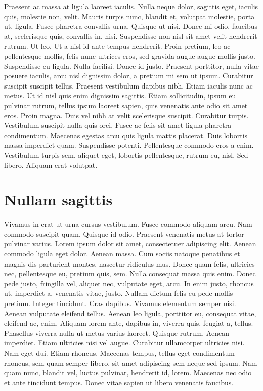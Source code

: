 \documentclass[a4paper,11pt]{scrartcl}
\begin{document}
 Praesent ac massa at ligula laoreet iaculis. Nulla neque dolor, sagittis eget, iaculis quis, molestie non, velit. Mauris turpis nunc, blandit et, volutpat molestie, porta ut, ligula. Fusce pharetra convallis urna. Quisque ut nisi. Donec mi odio, faucibus at, scelerisque quis, convallis in, nisi. Suspendisse non nisl sit amet velit hendrerit rutrum. Ut leo. Ut a nisl id ante tempus hendrerit. Proin pretium, leo ac pellentesque mollis, felis nunc ultrices eros, sed gravida augue augue mollis justo. Suspendisse eu ligula. Nulla facilisi. Donec id justo. Praesent porttitor, nulla vitae posuere iaculis, arcu nisl dignissim dolor, a pretium mi sem ut ipsum. Curabitur suscipit suscipit tellus. Praesent vestibulum dapibus nibh. Etiam iaculis nunc ac metus. Ut id nisl quis enim dignissim sagittis. Etiam sollicitudin, ipsum eu pulvinar rutrum, tellus ipsum laoreet sapien, quis venenatis ante odio sit amet eros. Proin magna. Duis vel nibh at velit scelerisque suscipit. Curabitur turpis. Vestibulum suscipit nulla quis orci. Fusce ac felis sit amet ligula pharetra condimentum. Maecenas egestas arcu quis ligula mattis placerat. Duis lobortis massa imperdiet quam. Suspendisse potenti. Pellentesque commodo eros a enim. Vestibulum turpis sem, aliquet eget, lobortis pellentesque, rutrum eu, nisl. Sed libero. Aliquam erat volutpat.
 
 \section{Nullam sagittis}
 Vivamus in erat ut urna cursus vestibulum. Fusce commodo aliquam arcu. Nam commodo suscipit quam. Quisque id odio. Praesent venenatis metus at tortor pulvinar varius. Lorem ipsum dolor sit amet, consectetuer adipiscing elit. Aenean commodo ligula eget dolor. Aenean massa. Cum sociis natoque penatibus et magnis dis parturient montes, nascetur ridiculus mus. Donec quam felis, ultricies nec, pellentesque eu, pretium quis, sem. Nulla consequat massa quis enim. Donec pede justo, fringilla vel, aliquet nec, vulputate eget, arcu. In enim justo, rhoncus ut, imperdiet a, venenatis vitae, justo. Nullam dictum felis eu pede mollis pretium. Integer tincidunt. Cras dapibus. Vivamus elementum semper nisi. Aenean vulputate eleifend tellus. Aenean leo ligula, porttitor eu, consequat vitae, eleifend ac, enim. Aliquam lorem ante, dapibus in, viverra quis, feugiat a, tellus. Phasellus viverra nulla ut metus varius laoreet. Quisque rutrum. Aenean imperdiet. Etiam ultricies nisi vel augue. Curabitur ullamcorper ultricies nisi. Nam eget dui. Etiam rhoncus. Maecenas tempus, tellus eget condimentum rhoncus, sem quam semper libero, sit amet adipiscing sem neque sed ipsum. Nam quam nunc, blandit vel, luctus pulvinar, hendrerit id, lorem. Maecenas nec odio et ante tincidunt tempus. Donec vitae sapien ut libero venenatis faucibus.
\end{document}
